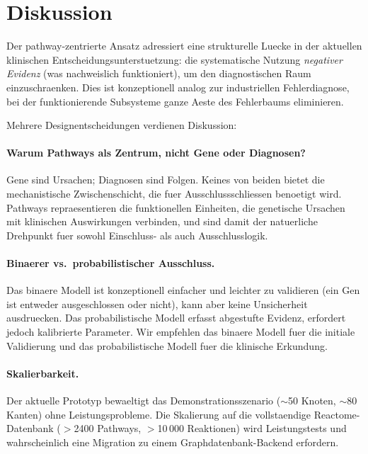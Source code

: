\documentclass[12pt,a4paper]{article}
\begin{document}
\section*{Diskussion}
\label{de:sec:discussion}

Der pathway-zentrierte Ansatz adressiert eine strukturelle Luecke in der aktuellen klinischen Entscheidungsunterstuetzung: die systematische Nutzung \emph{negativer Evidenz} (was nachweislich funktioniert), um den diagnostischen Raum einzuschraenken. Dies ist konzeptionell analog zur industriellen Fehlerdiagnose, bei der funktionierende Subsysteme ganze Aeste des Fehlerbaums eliminieren.

Mehrere Designentscheidungen verdienen Diskussion:

\paragraph{Warum Pathways als Zentrum, nicht Gene oder Diagnosen?} Gene sind Ursachen; Diagnosen sind Folgen. Keines von beiden bietet die mechanistische Zwischenschicht, die fuer Ausschlussschliessen benoetigt wird. Pathways repraesentieren die funktionellen Einheiten, die genetische Ursachen mit klinischen Auswirkungen verbinden, und sind damit der natuerliche Drehpunkt fuer sowohl Einschluss- als auch Ausschlusslogik.

\paragraph{Binaerer vs.\ probabilistischer Ausschluss.} Das binaere Modell ist konzeptionell einfacher und leichter zu validieren (ein Gen ist entweder ausgeschlossen oder nicht), kann aber keine Unsicherheit ausdruecken. Das probabilistische Modell erfasst abgestufte Evidenz, erfordert jedoch kalibrierte Parameter. Wir empfehlen das binaere Modell fuer die initiale Validierung und das probabilistische Modell fuer die klinische Erkundung.

\paragraph{Skalierbarkeit.} Der aktuelle Prototyp bewaeltigt das Demonstrationsszenario ($\sim$50 Knoten, $\sim$80 Kanten) ohne Leistungsprobleme. Die Skalierung auf die vollstaendige Reactome-Datenbank ($>$2400 Pathways, $>$10\,000 Reaktionen) wird Leistungstests und wahrscheinlich eine Migration zu einem Graphdatenbank-Backend erfordern.
\end{document}
